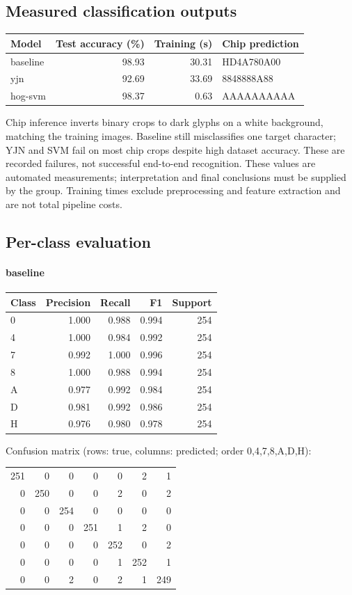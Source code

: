 \clearpage\subsection{Measured classification outputs}\begin{center}\begin{tabular}{lrrl}\toprule
Model & Test accuracy (\%) & Training (s) & Chip prediction \\ \midrule
baseline & 98.93 & 30.31 & HD4A780A00 \\
yjn & 92.69 & 33.69 & 8848888A88 \\
hog-svm & 98.37 & 0.63 & AAAAAAAAAA \\
\bottomrule\end{tabular}\end{center}
Chip inference inverts binary crops to dark glyphs on a white background, matching the training images. Baseline still misclassifies one target character; YJN and SVM fail on most chip crops despite high dataset accuracy. These are recorded failures, not successful end-to-end recognition. These values are automated measurements; interpretation and final conclusions must be supplied by the group. Training times exclude preprocessing and feature extraction and are not total pipeline costs.
\subsection{Per-class evaluation}
\paragraph{baseline}\begin{center}\begin{tabular}{lrrrr}\toprule Class & Precision & Recall & F1 & Support \\ \midrule
0 & 1.000 & 0.988 & 0.994 & 254 \\
4 & 1.000 & 0.984 & 0.992 & 254 \\
7 & 0.992 & 1.000 & 0.996 & 254 \\
8 & 1.000 & 0.988 & 0.994 & 254 \\
A & 0.977 & 0.992 & 0.984 & 254 \\
D & 0.981 & 0.992 & 0.986 & 254 \\
H & 0.976 & 0.980 & 0.978 & 254 \\
\bottomrule\end{tabular}\end{center}
\noindent Confusion matrix (rows: true, columns: predicted; order 0,4,7,8,A,D,H):
\begin{center}\begin{tabular}{rrrrrrr}
251 & 0 & 0 & 0 & 0 & 2 & 1 \\
0 & 250 & 0 & 0 & 2 & 0 & 2 \\
0 & 0 & 254 & 0 & 0 & 0 & 0 \\
0 & 0 & 0 & 251 & 1 & 2 & 0 \\
0 & 0 & 0 & 0 & 252 & 0 & 2 \\
0 & 0 & 0 & 0 & 1 & 252 & 1 \\
0 & 0 & 2 & 0 & 2 & 1 & 249 \\
\end{tabular}\end{center}

